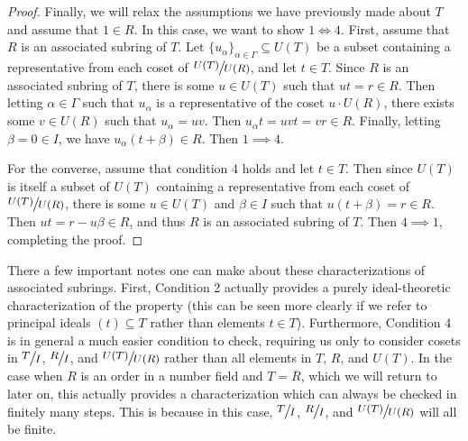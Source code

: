 \documentclass[12pt]{amsart}
\theoremstyle{definition}
\newcommand{\Rbar}{\overline{R}}
\newcommand{\quot}[2]{\large\sfrac{#1}{#2}\normalsize}
\begin{document}
\begin{proof}
		Finally, we will relax the assumptions we have previously made about $T$ and assume that $1\in R$. In this case, we want to show $1\iff 4$. First, assume that $R$ is an associated subring of $T$. Let $\{u_\alpha\}_{\alpha\in \Gamma}\subseteq U(T)$ be a subset containing a representative from each coset of $\quot{U(T)}{U(R)}$, and let $t\in T$. Since $R$ is an associated subring of $T$, there is some $u\in U(T)$ such that $ut=r\in R$. Then letting $\alpha\in \Gamma$ such that $u_\alpha$ is a representative of the coset $u\cdot U(R)$, there exists some $v\in U(R)$ such that $u_\alpha=uv$. Then $u_\alpha t=uvt=vr\in R$. Finally, letting $\beta=0\in I$, we have $u_\alpha(t+\beta)\in R$. Then $1\implies 4$.
		
		For the converse, assume that condition 4 holds and let $t\in T$. Then since $U(T)$ is itself a subset of $U(T)$ containing a representative from each coset of $\quot{U(T)}{U(R)}$, there is some $u\in U(T)$ and $\beta\in I$ such that $u(t+\beta)=r\in R$. Then $ut=r-u\beta\in R$, and thus $R$ is an associated subring of $T$. Then $4\implies 1$, completing the proof.
	\end{proof}
	
	There a few important notes one can make about these characterizations of associated subrings. First, Condition 2 actually provides a purely ideal-theoretic characterization of the property (this can be seen more clearly if we refer to principal ideals $(t)\subseteq T$ rather than elements $t\in T$). Furthermore, Condition 4 is in general a much easier condition to check, requiring us only to consider cosets in $\quot{T}{I}$, $\quot{R}{I}$, and $\quot{U(T)}{U(R)}$ rather than all elements in $T$, $R$, and $U(T)$. In the case when $R$ is an order in a number field and $T=\Rbar$, which we will return to later on, this actually provides a characterization which can always be checked in finitely many steps. This is because in this case, $\quot{T}{I}$, $\quot{R}{I}$, and $\quot{U(T)}{U(R)}$ will all be finite.
	
\end{document}
